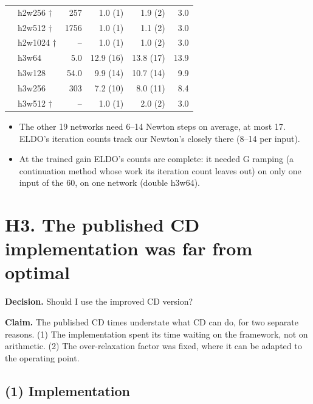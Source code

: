 \documentclass[11pt,a4paper]{article}
\newcommand{\claim}[1]{\par\noindent\textbf{Claim.} #1\par}
\newcommand{\decision}[1]{\par\noindent\textbf{Decision.} #1\par}
\begin{document}
\begin{center}
\begin{tabular}{llrrrr}
       & h2w256 $\dagger$ & 257  & 1.0 (1)   & 1.9 (2)   & 3.0 \\
       & h2w512 $\dagger$ & 1756 & 1.0 (1)   & 1.1 (2)   & 3.0 \\
       & h2w1024 $\dagger$& --   & 1.0 (1)   & 1.0 (2)   & 3.0 \\
       & h3w64            & 5.0  & 12.9 (16) & 13.8 (17) & 13.9 \\
       & h3w128           & 54.0 & 9.9 (14)  & 10.7 (14) & 9.9 \\
       & h3w256           & 303  & 7.2 (10)  & 8.0 (11)  & 8.4 \\
       & h3w512 $\dagger$ & --   & 1.0 (1)   & 2.0 (2)   & 3.0 \\
\bottomrule
\end{tabular}
\end{center}

\begin{itemize}
\item The other 19 networks need 6--14 Newton steps on average, at most 17.
ELDO's iteration counts track our Newton's closely there (8--14 per
input).
\item At the trained gain ELDO's counts are complete: it needed G ramping
(a continuation method whose work its iteration count leaves out) on only
one input of the 60, on one network (double h3w64).
\end{itemize}

\section*{H3. The published CD implementation was far from optimal}

\decision{Should I use the improved CD version?}

\claim{The published CD times understate what CD can do, for two separate
reasons. (1) The implementation spent its time waiting on the framework,
not on arithmetic. (2) The over-relaxation factor was fixed, where it can
be adapted to the operating point.}

\subsection*{(1) Implementation}
\end{document}
